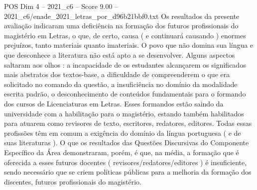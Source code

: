 \begin{textsample}{POS Dim 4 – 2021\_c6 – Score 9.00 – 2021\_c6/enade\_2021\_letras\_por\_d96b21bbf0.txt}
Os resultados da presente avaliação indicaram uma deficiência na formação dos futuros profissionais do magistério em Letras, o que, de certo, causa ( e continuará causando ) enormes prejuízos, tanto materiais quanto imateriais.
O povo que não domina sua língua e que desconhece a literatura não está apto a se desenvolver.
Alguns aspectos saltaram aos olhos : a incapacidade de os estudantes alcançarem os significados mais abstratos dos textos-base, a dificuldade de compreenderem o que era solicitado no comando da questão, a insuficiência no domínio da modalidade escrita padrão, o desconhecimento de conteúdos fundamentais para o formando dos cursos de Licenciaturas em Letras.
Esses formandos estão saindo da universidade com a habilitação para o magistério, estando também habilitados para atuarem como revisores de texto, escritores, redatores, editores.
Todas essas profissões têm em comum a exigência do domínio da língua portuguesa ( e de suas literaturas ).
O que os resultados das Questões Discursivas do Componente Específico da Área demonstraram, porém, é que, na média, a formação que é oferecida a esses futuros docentes ( revisores/redatores/editores ) é insuficiente, sendo necessário que se criem políticas públicas para a melhoria da formação dos discentes, futuros profissionais do magistério.

\end{textsample}
